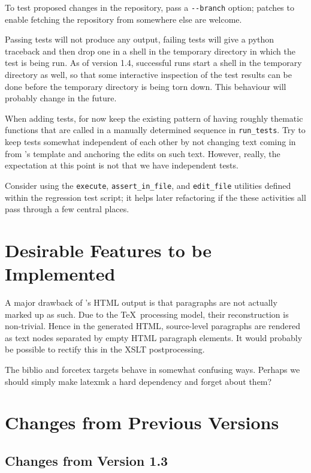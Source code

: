 \documentclass[11pt,a4paper]{ivoa}
\begin{document}
To test proposed changes in the \ivoatex repository, pass a
\verb|--branch| option; patches to enable fetching the repository from
somewhere else are welcome.

Passing tests will not produce any output, failing tests will give a
python traceback and then drop one in a shell in the temporary directory
in which the test is being run.  As of version 1.4, successful runs
start a shell in the temporary directory as well, so that some
interactive inspection of the test results can be done before the
temporary directory is being torn down.  This behaviour will probably
change in the future.

When adding tests, for now keep the existing pattern of having roughly
thematic functions that are called in a manually determined sequence in
\verb|run_tests|.  Try to keep tests somewhat independent of each other by
not changing text coming in from \ivoatex's template and anchoring the
edits on such text.  However, really, the expectation at this point is
not that we have independent tests.

Consider using the \verb|execute|, \verb|assert_in_file|, and
\verb|edit_file| utilities defined within the regression test script; it
helps later refactoring if the these activities all pass through a few
central places.

\section{Desirable Features to be Implemented}

A major drawback of \ivoatex's HTML output is that paragraphs are not actually
marked up as such.  Due to the \TeX\ processing model, their
reconstruction is non-trivial.  Hence in the generated HTML,
source-level paragraphs are rendered as text nodes separated by empty
HTML paragraph elements.  It would probably be possible to rectify this
in the XSLT postprocessing.

The biblio and forcetex targets behave in somewhat confusing ways.
Perhaps we should simply make latexmk a hard dependency and forget about
them?

\appendix
\section{Changes from Previous Versions}

\subsection{Changes from Version 1.3}
\end{document}

